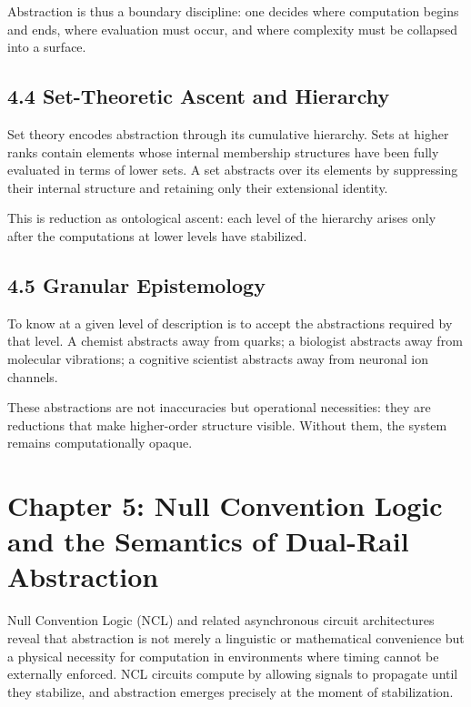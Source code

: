 \documentclass[12pt,letterpaper]{article}
\theoremstyle{remark}
\begin{document}
Abstraction is thus a boundary discipline: one decides where computation begins and ends, where evaluation must occur, and where complexity must be collapsed into a surface.

\subsection{4.4 Set-Theoretic Ascent and Hierarchy}

Set theory encodes abstraction through its cumulative hierarchy. Sets at higher ranks contain elements whose internal membership structures have been fully evaluated in terms of lower sets. A set abstracts over its elements by suppressing their internal structure and retaining only their extensional identity.

This is reduction as ontological ascent: each level of the hierarchy arises only after the computations at lower levels have stabilized.

\subsection{4.5 Granular Epistemology}

To know at a given level of description is to accept the abstractions required by that level. A chemist abstracts away from quarks; a biologist abstracts away from molecular vibrations; a cognitive scientist abstracts away from neuronal ion channels.

These abstractions are not inaccuracies but operational necessities: they are reductions that make higher-order structure visible. Without them, the system remains computationally opaque.

\newpage

\section{Chapter 5: Null Convention Logic and the Semantics of Dual-Rail Abstraction}

Null Convention Logic (NCL) and related asynchronous circuit architectures reveal that abstraction is not merely a linguistic or mathematical convenience but a physical necessity for computation in environments where timing cannot be externally enforced. NCL circuits compute by allowing signals to propagate until they stabilize, and abstraction emerges precisely at the moment of stabilization.
\end{document}
